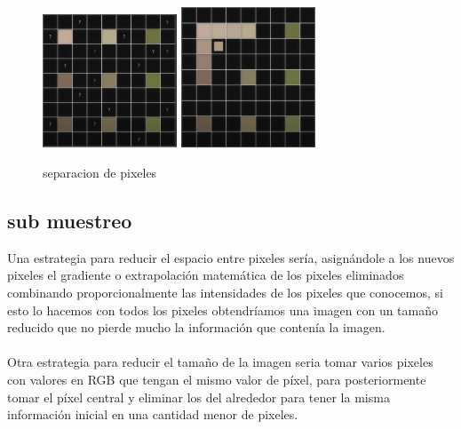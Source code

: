 \documentclass{article}
\begin{document}
\begin{figure}[h]
\includegraphics[width=4cm]{matriz_a_llenar.png}
\includegraphics[width=4cm]{llenado_de_matriz.png}
\centering
\caption{separacion de pixeles}
\label{fig:matriz de leds}
\end{figure}






\subsection{sub muestreo }\label{contenido}
Una estrategia para reducir el espacio entre pixeles sería, asignándole a los nuevos pixeles el gradiente o extrapolación matemática de los pixeles eliminados combinando proporcionalmente las intensidades de los pixeles que conocemos, si esto lo hacemos con todos los pixeles obtendríamos una imagen con un tamaño reducido que no pierde mucho la información que contenía la imagen. \\\\
Otra estrategia para reducir el tamaño de la imagen seria tomar varios pixeles con valores en RGB que tengan el mismo valor de píxel, para posteriormente tomar el píxel central y eliminar los del alrededor para tener la misma información inicial en una cantidad menor de pixeles.\\\\
\end{document}
